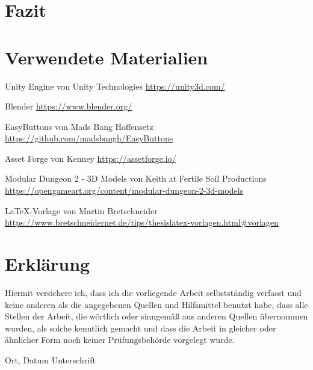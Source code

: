 




\chapter{Fazit}\label{c.zusammenfassung}



\chapter{Verwendete Materialien}

Unity Engine von Unity Technologies
\newblock \url{https://unity3d.com/}

Blender
\newblock \url{https://www.blender.org/}

EasyButtons von Mads Bang Hoffensetz
\newblock \url{https://github.com/madsbangh/EasyButtons}

Asset Forge von Kenney
\newblock \url{https://assetforge.io/}

Modular Dungeon 2 - 3D Models von Keith at Fertile Soil Productions \label{m.tuer}
\newblock \url{https://opengameart.org/content/modular-dungeon-2-3d-models}

\LaTeX -Vorlage von Martin Bretschneider 
\newblock \url{https://www.bretschneidernet.de/tips/thesislatex-vorlagen.html#vorlagen}




\chapter*{Erklärung}

Hiermit versichere ich, dass ich die vorliegende Arbeit selbstständig verfasst und keine anderen als die angegebenen Quellen und Hilfsmittel benutzt habe, dass alle Stellen der Arbeit, die wörtlich oder sinngemäß aus anderen Quellen übernommen wurden, als solche kenntlich gemacht und dass die Arbeit in gleicher oder ähnlicher Form noch keiner Prüfungsbehörde vorgelegt wurde.

\vspace{3cm}
Ort, Datum \hspace{5cm} Unterschrift \\

